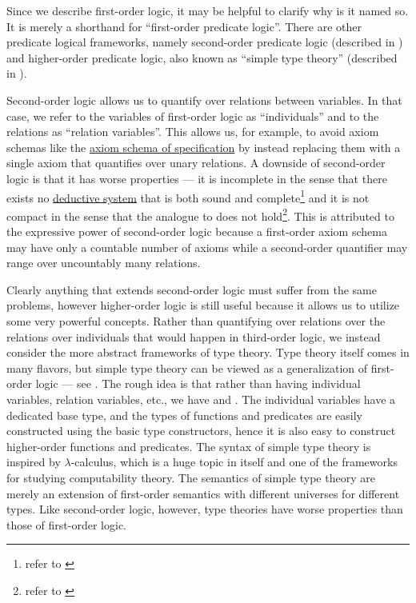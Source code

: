 \begin{remark}\label{rem:higher_order_logic}
  Since we describe first-order logic, it may be helpful to clarify why is it named so. It is merely a shorthand for \enquote{first-order predicate logic}. There are other predicate logical frameworks, namely second-order predicate logic (described in \cite[ch. VIII]{OpenLogicFull}) and higher-order predicate logic, also known as \enquote{simple type theory} (described in \cite[sec. 3]{Farmer2008}).

  Second-order logic allows us to quantify over relations between variables. In that case, we refer to the variables of first-order logic as \enquote{individuals} and to the relations as \enquote{relation variables}. This allows us, for example, to avoid axiom schemas like the \hyperref[def:zfc/specification]{axiom schema of specification} by instead replacing them with a single axiom that quantifies over unary relations. A downside of second-order logic is that it has worse properties --- it is incomplete in the sense that there exists no \hyperref[def:deductive_system]{deductive system} that is both sound and complete\footnote{refer to \cite[thm. 39.6]{OpenLogicFull}} and it is not compact in the sense that the analogue to  does not hold\footnote{refer to \cite[thm. 39.7]{OpenLogicFull}}. This is attributed to the expressive power of second-order logic because a first-order axiom schema may have only a countable number of axioms while a second-order quantifier may range over uncountably many relations.

  Clearly anything that extends second-order logic must suffer from the same problems, however higher-order logic is still useful because it allows us to utilize some very powerful concepts. Rather than quantifying over relations over the relations over individuals that would happen in third-order logic, we instead consider the more abstract frameworks of type theory. Type theory itself comes in many flavors, but simple type theory can be viewed as a generalization of first-order logic --- see \cite[thm. 2]{Farmer2008}. The rough idea is that rather than having individual variables, relation variables, etc., we have  and . The individual variables have a dedicated base type, and the types of functions and predicates are easily constructed using the basic type constructors, hence it is also easy to construct higher-order functions and predicates. The syntax of simple type theory is inspired by \( \lambda \)-calculus, which is a huge topic in itself and one of the frameworks for studying computability theory. The semantics of simple type theory are merely an extension of first-order semantics with different universes for different types. Like second-order logic, however, type theories have worse properties than those of first-order logic.


\end{remark}
